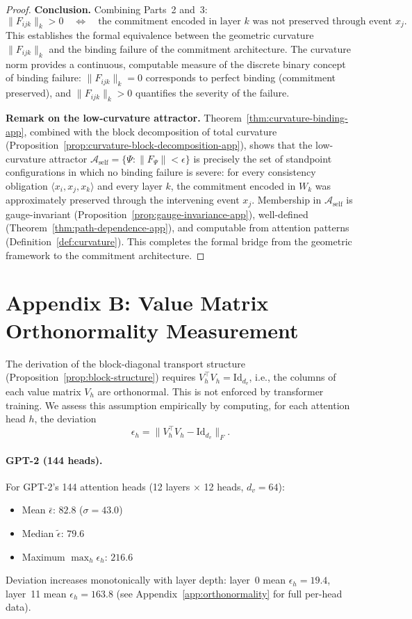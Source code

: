 \begin{proof}
\medskip\noindent\textbf{Conclusion.}
Combining Parts~2 and~3:
\[
    \|F_{ijk}\|_k > 0
    \quad\Longleftrightarrow\quad
    \text{the commitment encoded in layer $k$ was not preserved through event $x_j$.}
\]
This establishes the formal equivalence between the geometric curvature
$\|F_{ijk}\|_k$ and the binding failure of the commitment architecture. The curvature
norm provides a continuous, computable measure of the discrete binary concept of binding
failure: $\|F_{ijk}\|_k = 0$ corresponds to perfect binding (commitment preserved), and
$\|F_{ijk}\|_k > 0$ quantifies the severity of the failure.

\medskip\noindent\textbf{Remark on the low-curvature attractor.}
Theorem~\ref{thm:curvature-binding-app}, combined with the block decomposition of total
curvature (Proposition~\ref{prop:curvature-block-decomposition-app}), shows that the
low-curvature attractor $\mathcal{A}_{\mathrm{self}} = \{\Psi : \|F_\Psi\| < \epsilon\}$
is precisely the set of standpoint configurations in which no binding failure is severe:
for every consistency obligation $\langle x_i, x_j, x_k \rangle$ and every layer $k$, the
commitment encoded in $W_k$ was approximately preserved through the intervening event $x_j$.
Membership in $\mathcal{A}_{\mathrm{self}}$ is gauge-invariant
(Proposition~\ref{prop:gauge-invariance-app}), well-defined
(Theorem~\ref{thm:path-dependence-app}), and computable from attention patterns
(Definition~\ref{def:curvature}). This completes the formal bridge from the geometric
framework to the commitment architecture.
\end{proof}

\section*{Appendix B: Value Matrix Orthonormality Measurement}
\label{app:orthonorm}

The derivation of the block-diagonal transport structure
(Proposition~\ref{prop:block-structure}) requires $V_h^\top V_h = \mathrm{Id}_{d_v}$,
i.e., the columns of each value matrix $V_h$ are orthonormal. This is not enforced by
transformer training. We assess this assumption empirically by computing, for each
attention head $h$, the deviation
\[
    \epsilon_h = \|V_h^\top V_h - \mathrm{Id}_{d_v}\|_F.
\]

\paragraph{GPT-2 (144 heads).}
For GPT-2's 144 attention heads (12 layers $\times$ 12 heads, $d_v = 64$):
\begin{itemize}
    \item Mean $\bar{\epsilon}$: $82.8$ ($\sigma = 43.0$)
    \item Median $\tilde{\epsilon}$: $79.6$
    \item Maximum $\max_h \epsilon_h$: $216.6$
\end{itemize}
Deviation increases monotonically with layer depth: layer~0 mean $\epsilon_h = 19.4$,
layer~11 mean $\epsilon_h = 163.8$ (see Appendix~\ref{app:orthonormality} for full per-head data).

